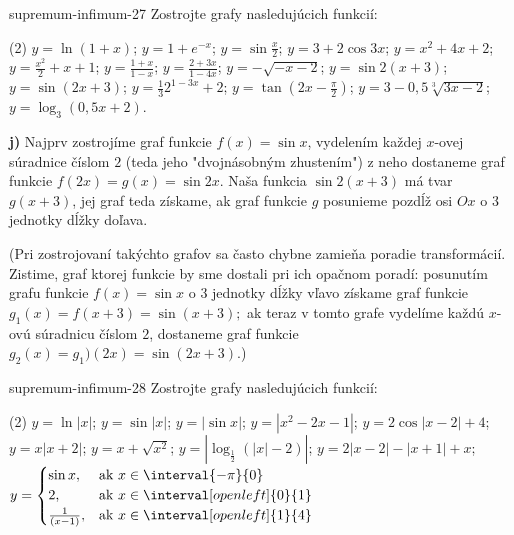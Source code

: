 \begin{defproblem}{supremum-infimum-27}
Zostrojte grafy nasledujúcich funkcií:
\begin{tasks}(2)
  \task $y=\ln (1+x)$;
  \task $y=1+e^{-x}$;
  \task $y=\sin \frac{x}{2}$;
  \task $y=3+2\cos 3x$;
  \task $y=x^2+4x+2$;
  \task $y=\frac{x^2}{2}+x+1$;
  \task $y=\frac{1+x}{1-x}$;
  \task $y=\frac{2+3x}{1-4x}$;
  \task $y=-\sqrt{-x-2}$;
  \task $y=\sin 2(x+3)$;
  \task $y=\sin (2x+3)$;
  \task $y=\frac{1}{3}2^{1-3x}+2$;
  \task $y=\tan (2x-\frac{\pi}{2})$;
  \task $y=3-0,5\sqrt[3]{3x-2}$;
  \task $y=\log_3 (0,5x+2)$.
\end{tasks}

\begin{solution}
  \textbf{j)}
  Najprv zostrojíme graf funkcie $f(x)=\sin x$, vydelením každej $x$-ovej
  súradnice číslom $2$ (teda jeho "dvojnásobným zhustením") z neho dostaneme
  graf funkcie $f(2x)=g(x)=\sin 2x$. Naša funkcia $\sin 2(x+3)$ má tvar
  $g(x+3)$, jej graf teda získame, ak graf funkcie $g$ posunieme pozdĺž osi $Ox$
  o $3$ jednotky dĺžky doľava.

  (Pri zostrojovaní takýchto grafov sa často chybne zamieňa poradie
  transformácií. Zistime, graf ktorej funkcie by sme dostali pri ich opačnom
  poradí: posunutím grafu funkcie $f(x) = \sin{x}$ o $3$ jednotky dĺžky vľavo
  získame graf funkcie $g_1(x) = f(x + 3) = \sin{(x+3)};$ ak teraz v tomto grafe
  vydelíme každú $x$-ovú súradnicu číslom $2$, dostaneme graf funkcie $g_2(x) =
  g_1)(2x) = \sin{(2x+3)}$.)
\end{solution}
\end{defproblem}

\begin{defproblem}{supremum-infimum-28}
Zostrojte grafy nasledujúcich funkcií:
\begin{tasks}(2)
  \task $y=\ln |x|$;
  \task $y=\sin |x|$;
  \task $y=|\sin x|$;
  \task $y=|x^2-2x-1|$;
  \task $y=2\cos |x-2|+4$;
  \task $y=x|x+2|$;
  \task $y=x+\sqrt{x^2}$;
  \task $y=|\log_{\frac{1}{2}}(|x|-2)|$;
  \task $y=2|x-2|-|x+1|+x$;
  \task $y=
    \begin{cases}
      \sin x,          & \text{ak } x \in \interval{-\pi}{0} \\
      2,               & \text{ak } x \in \interval[open left]{0}{1} \\
      \frac{1}{(x-1)}, & \text{ak } x \in \interval[open left]{1}{4}
    \end{cases}
  $
\end{tasks}
\end{defproblem}

